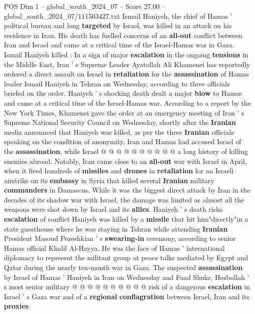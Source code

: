 \begin{textsample}{POS Dim 1 – global\_south\_2024\_07 – Score 27.00 – global\_south\_2024\_07/111503427.txt}  \label{ex:f1_pos_061}
Ismail Haniyeh, the chief of Hamas ' political bureau and long \textbf{targeted} by Israel, was killed in an attack on his residence in Iran.
His death has fuelled concerns of an \textbf{all-out} conflict between Iran and Israel and came at a critical time of the Israel-Hamas war in Gaza.
Ismail Haniyeh killed : In a sign of major \textbf{escalation} in the ongoing \textbf{tensions} in the Middle East, Iran ' s Supreme Leader Ayatollah Ali Khamenei has reportedly ordered a direct assault on Israel in \textbf{retaliation} for the \textbf{assassination} of Hamas leader Ismail Haniyeh in Tehran on Wednesday, according to three officials briefed on the order.
Haniyeh ' s shocking death dealt a major \textbf{blow} to Hamas and came at a critical time of the Israel-Hamas war.
According to a report by the New York Times, Khamenei gave the order at an emergency meeting of Iran ' s Supreme National Security Council on Wednesday, shortly after the \textbf{Iranian} media announced that Haniyeh was killed, as per the three \textbf{Iranian} officials speaking on the condition of anonymity.
Iran and Hamas had accused Israel of the \textbf{assassination}, while Israel @ @ @ @ @ @ @ @ @ @ a long history of killing enemies abroad.
Notably, Iran came close to an \textbf{all-out} war with Israel in April, when it fired hundreds of \textbf{missiles} and \textbf{drones} in \textbf{retaliation} for an Israeli airstrike on its \textbf{embassy} in Syria that killed several \textbf{Iranian} military \textbf{commanders} in Damascus.
While it was the biggest direct attack by Iran in the decades of its shadow war with Israel, the damage was limited as almost all the weapons were shot down by Israel and its \textbf{allies}.
Haniyeh ' s death risks \textbf{escalation} of conflict Haniyeh was killed by a \textbf{missile} that hit him"directly"in a state guesthouse where he was staying in Tehran while attending \textbf{Iranian} President Masoud Pezeshkian ' s \textbf{swearing-in} ceremony, according to senior Hamas official Khalil Al-Hayya.
He was the face of Hamas ' international diplomacy to represent the militant group at peace talks mediated by Egypt and Qatar during the nearly ten-month war in Gaza.
The suspected \textbf{assassination} by Israel of Hamas ' Haniyeh in Iran on Wednesday and Fuad Shukr, Hezbollah ' s most senior military @ @ @ @ @ @ @ @ @ @ risk of a dangerous \textbf{escalation} in Israel ' s Gaza war and of a \textbf{regional} \textbf{conflagration} between Israel, Iran and its \textbf{proxies}.

\end{textsample}
